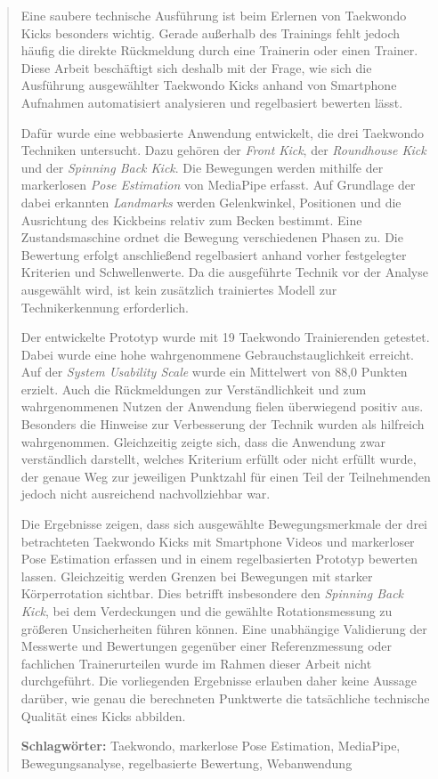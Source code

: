 \documentclass[intern]{cgMA}
\begin{document}
\begin{abstract}
Eine saubere technische Ausführung ist beim Erlernen von Taekwondo Kicks besonders wichtig. Gerade außerhalb des Trainings fehlt jedoch häufig die direkte Rückmeldung durch eine Trainerin oder einen Trainer. Diese Arbeit beschäftigt sich deshalb mit der Frage, wie sich die Ausführung ausgewählter Taekwondo Kicks anhand von Smartphone Aufnahmen automatisiert analysieren und regelbasiert bewerten lässt.

Dafür wurde eine webbasierte Anwendung entwickelt, die drei Taekwondo Techniken untersucht. Dazu gehören der \textit{Front Kick}, der \textit{Roundhouse Kick} und der \textit{Spinning Back Kick}. Die Bewegungen werden mithilfe der markerlosen \textit{Pose Estimation} von MediaPipe erfasst. Auf Grundlage der dabei erkannten \textit{Landmarks} werden Gelenkwinkel, Positionen und die Ausrichtung des Kickbeins relativ zum Becken bestimmt. Eine Zustandsmaschine ordnet die Bewegung verschiedenen Phasen zu. Die Bewertung erfolgt anschließend regelbasiert anhand vorher festgelegter Kriterien und Schwellenwerte. Da die ausgeführte Technik vor der Analyse ausgewählt wird, ist kein zusätzlich trainiertes Modell zur Technikerkennung erforderlich.

Der entwickelte Prototyp wurde mit 19 Taekwondo Trainierenden getestet. Dabei wurde eine hohe wahrgenommene Gebrauchstauglichkeit erreicht. Auf der \textit{System Usability Scale} wurde ein Mittelwert von 88,0 Punkten erzielt. Auch die Rückmeldungen zur Verständlichkeit und zum wahrgenommenen Nutzen der Anwendung fielen überwiegend positiv aus. Besonders die Hinweise zur Verbesserung der Technik wurden als hilfreich wahrgenommen. Gleichzeitig zeigte sich, dass die Anwendung zwar verständlich darstellt, welches Kriterium erfüllt oder nicht erfüllt wurde, der genaue Weg zur jeweiligen Punktzahl für einen Teil der Teilnehmenden jedoch nicht ausreichend nachvollziehbar war.

Die Ergebnisse zeigen, dass sich ausgewählte Bewegungsmerkmale der drei betrachteten Taekwondo Kicks mit Smartphone Videos und markerloser Pose Estimation erfassen und in einem regelbasierten Prototyp bewerten lassen. Gleichzeitig werden Grenzen bei Bewegungen mit starker Körperrotation sichtbar. Dies betrifft insbesondere den \textit{Spinning Back Kick}, bei dem Verdeckungen und die gewählte Rotationsmessung zu größeren Unsicherheiten führen können. Eine unabhängige Validierung der Messwerte und Bewertungen gegenüber einer Referenzmessung oder fachlichen Trainerurteilen wurde im Rahmen dieser Arbeit nicht durchgeführt. Die vorliegenden Ergebnisse erlauben daher keine Aussage darüber, wie genau die berechneten Punktwerte die tatsächliche technische Qualität eines Kicks abbilden.

\bigskip
\noindent\textbf{Schlagwörter:} Taekwondo, markerlose Pose Estimation, MediaPipe, Bewegungsanalyse, regelbasierte Bewertung, Webanwendung
\end{abstract}
\end{document}
